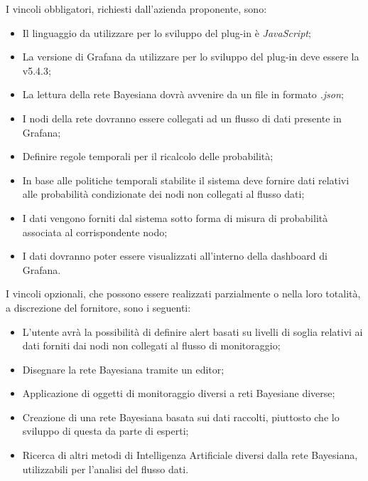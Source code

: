 I vincoli obbligatori, richiesti dall'azienda proponente, sono:
\begin{itemize}
	\item Il linguaggio da utilizzare per lo sviluppo del plug-in è \textit{JavaScript};
	\item La versione di Grafana da utilizzare per lo sviluppo del plug-in deve essere la v5.4.3;
	\item La lettura della rete Bayesiana dovrà avvenire da un file in formato \textit{.json};
	\item I nodi della rete dovranno essere collegati ad un flusso di dati presente in Grafana;
	\item Definire regole temporali per il ricalcolo delle probabilità;
	\item In base alle politiche temporali stabilite il sistema deve fornire dati relativi alle probabilità condizionate dei nodi non collegati al flusso dati;
	\item I dati vengono forniti dal sistema sotto forma di misura di probabilità associata al corrispondente nodo; 
	\item I dati dovranno poter essere visualizzati all'interno della dashboard di Grafana.
\end{itemize}

I vincoli opzionali, che possono essere realizzati parzialmente o nella loro totalità, a discrezione del fornitore, sono i seguenti: 
\begin{itemize}
\item L'utente avrà la possibilità di definire alert basati su livelli di soglia relativi ai dati forniti dai nodi non collegati al flusso di monitoraggio;
\item Disegnare la rete Bayesiana tramite un editor; 
\item Applicazione di oggetti di monitoraggio diversi a reti Bayesiane diverse;
\item Creazione di una rete Bayesiana basata sui dati raccolti, piuttosto che lo sviluppo di questa da parte di esperti; 
\item Ricerca di altri metodi di Intelligenza Artificiale diversi dalla rete Bayesiana, utilizzabili per l'analisi del flusso dati. 
\end{itemize}
